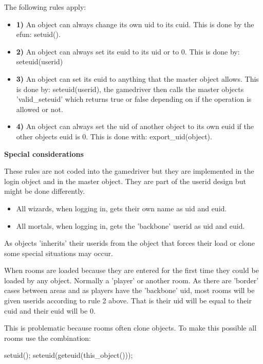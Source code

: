 The following rules apply:

\begin{itemize}
\item{\bf 1)}   An object can always change its own uid to its cuid. This is done
    by the efun: setuid().

\item{\bf 2)}   An object can always set its euid to its uid or to 0.
    This is done by: seteuid(userid)

\item{\bf 3)}   An object can set its euid to anything that the master object allows.
    This is done by: seteuid(userid), the gamedriver then calls the
    master objects 'valid\_seteuid' which returns true or false depending
    on if the operation is allowed or not.

\item{\bf 4)}   An object can always set the uid of another object to its own euid
    if the other objects euid is 0. This is done with: export\_uid(object).
\end{itemize}

{\bf Special considerations}

These rules are not coded into the gamedriver but they are implemented in
the login object and in the master object. They are part of the userid design
but might be done differently.

\begin{itemize}
\item  All wizards, when logging in, gets their own name as uid and euid. 

\item  All mortals, when logging in, gets the 'backbone' userid as uid and euid.
\end{itemize}

As objects 'inherits' their userids from the object that forces their load
or clone some special situations may occur.

When rooms are loaded because they are entered for the first time they could
be loaded by any object. Normally a 'player' or another room. As there are
'border' cases between areas and as players have the 'backbone' uid, most rooms
will be given userids according to rule 2 above. That is their uid will be 
equal to their cuid and their euid will be 0.

This is problematic because rooms often clone objects. To make this possible
all rooms use the combination: 
    
        setuid(); seteuid(geteuid(this\_object())); 


